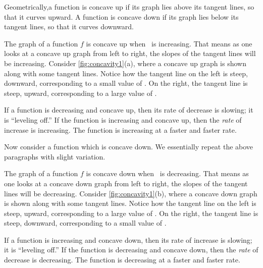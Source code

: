 Geometrically,a function is concave up if its graph lies above its tangent lines, so that it curves upward. A function is concave down if its graph lies below its tangent lines, so that it curves downward.

The graph of a function $f$ is concave up when \fp\ is increasing. That means as one looks at a concave up graph from left to right, the slopes of the tangent lines will be increasing. Consider \autoref{fig:concavity1}(a), where a concave up graph is shown along with some tangent lines. Notice how the tangent line on the left is steep, downward, corresponding to a  small value of \fp. On the right, the tangent line is steep, upward, corresponding to a large value of \fp.

%

If a function is decreasing and concave up, then its rate of decrease is slowing; it is ``leveling off.''  If the  function is increasing and concave up, then the \textit{rate} of increase is increasing.  The function is increasing at a faster and faster rate.

Now consider a function which is concave down. We essentially repeat the above paragraphs with slight variation.

The graph of a function $f$ is concave down  when \fp\ is decreasing. That means as one looks at a concave down graph from left to right, the slopes of the tangent lines will be decreasing. Consider \autoref{fig:concavity1}(b), where a concave down graph is shown along with some tangent lines. Notice how the tangent line on the left is  steep, upward, corresponding to a large value of \fp. On the right, the tangent line is steep, downward, corresponding to a small value of \fp.

If a function is increasing and concave down, then its rate of increase is slowing; it is ``leveling off.''  If the function is decreasing and concave down, then the \textit{rate} of decrease is decreasing.  The function is decreasing at a faster and faster rate.


